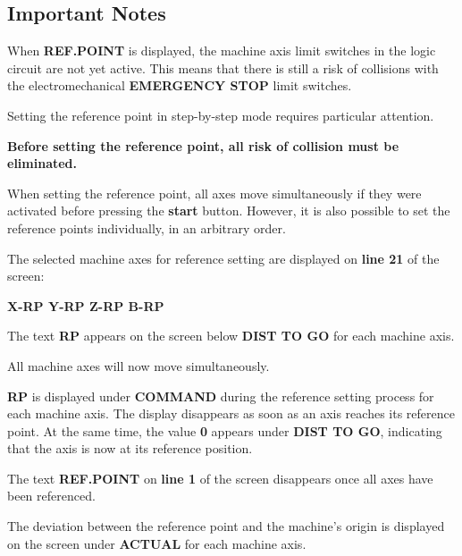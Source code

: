 \subsection{Important Notes}

When \textbf{REF.POINT} is displayed, the machine axis limit switches in the logic circuit are not yet active. This means that there is still a risk of collisions with the electromechanical \textbf{EMERGENCY STOP} limit switches.

Setting the reference point in step-by-step mode requires particular attention.

\textbf{Before setting the reference point, all risk of collision must be eliminated.}

When setting the reference point, all axes move simultaneously if they were activated before pressing the \textbf{start} button. However, it is also possible to set the reference points individually, in an arbitrary order.

\procedure

\begin{itemize}
\end{itemize}

The selected machine axes for reference setting are displayed on \textbf{line 21} of the screen:

\begin{center}
    \textbf{X-RP \quad Y-RP \quad Z-RP \quad B-RP}
\end{center}

The text \textbf{RP} appears on the screen below \textbf{DIST TO GO} for each machine axis.

\begin{itemize}
\end{itemize}

All machine axes will now move simultaneously.

\textbf{RP} is displayed under \textbf{COMMAND} during the reference setting process for each machine axis. The display disappears as soon as an axis reaches its reference point. At the same time, the value \textbf{0} appears under \textbf{DIST TO GO}, indicating that the axis is now at its reference position.

The text \textbf{REF.POINT} on \textbf{line 1} of the screen disappears once all axes have been referenced.

The deviation between the reference point and the machine's origin is displayed on the screen under \textbf{ACTUAL} for each machine axis.


